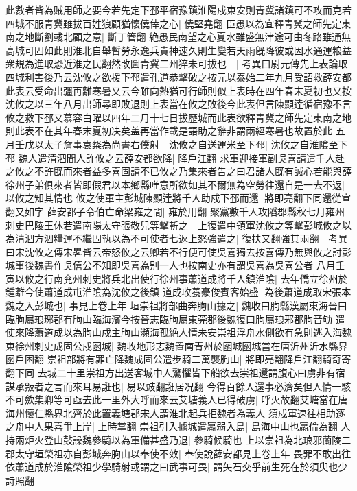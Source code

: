此數者皆為賊用師之要今若先定下邳平宿豫鎮淮陽戍東安則青冀諸鎮可不攻而克若四城不服青冀雖拔百姓狼顧猶懷僥倖之心|{
	僥堅堯翻}
臣愚以為宜釋青冀之師先定東南之地斷劉彧北顧之意|{
	斷丁管翻}
絶愚民南望之心夏水雖盛無津途可由冬路雖通無高城可固如此則淮北自舉暫勞永逸兵貴神速久則生變若天雨旣降彼或因水通運粮益衆規為進取恐近淮之民翻然改圖青冀二州猝未可拔也　|{
	考異曰尉元傳先上表論取四城利害後乃云沈攸之欲援下邳遣孔道恭擊破之按元以泰始二年九月受詔救薛安都此表云受命出疆再離寒暑又云今雖向熱猶可行師則似上表時在四年春末夏初也又按沈攸之以三年八月出師尋即敗退則上表當在攸之敗後今此表但言陳顯逹循宿豫不言攸之救下邳又慕容白曜以四年二月十七日拔歷城而此表欲釋青冀之師先定東南之地則此表不在其年春末夏初决矣盖再當作載是語助之辭非謂兩經寒暑也故置於此}
五月壬戌以太子詹事袁粲為尚書右僕射　沈攸之自送運米至下邳|{
	沈攸之自淮隂至下邳}
魏人遣清泗間人詐攸之云薛安都欲降|{
	降戶江翻}
求軍迎接軍副吳喜請遣千人赴之攸之不許旣而來者益多喜固請不已攸之乃集來者告之曰君諸人旣有誠心若能與薛徐州子弟俱來者皆即假君以本鄉縣唯意所欲如其不爾無為空勞往還自是一去不返|{
	以攸之知其情也}
攸之使軍主彭城陳顯逹將千人助戍下邳而還|{
	將即亮翻下同還從宣翻又如字}
薛安都子令伯亡命梁雍之間|{
	雍於用翻}
聚黨數千人攻䧟郡縣秋七月雍州刺史巴陵王休若遣南陽太守張敬兒等擊斬之　上復遣中領軍沈攸之等擊彭城攸之以為清泗方涸糧運不繼固執以為不可使者七返上怒強遣之|{
	復扶又翻強其兩翻　考異曰宋沈攸之傳宋畧皆云帝怒攸之云卿若不行便可使吳喜獨去按喜傳乃無與攸之討彭城事後魏書作吳僖公不知即吳喜為别一人也按南史亦有謂吳喜為吳喜公者}
八月壬寅以攸之行南兖州刺史將兵北出使行徐州事蕭道成將千人鎮淮隂|{
	去年僑立徐州於鍾離今使蕭道成屯淮隂為沈攸之後鎮}
道成收養豪俊賓客始盛|{
	為後蕭道成取宋張本}
魏之入彭城也|{
	事見上卷上年}
垣崇祖將部曲奔朐山據之|{
	魏收曰胊縣漢屬東海晉曰臨朐屬琅琊郡有朐山臨海濱今按晉志臨朐屬東莞郡後魏復曰朐屬琅邪郡朐音劬}
遣使來降蕭道成以為朐山戍主朐山瀕海孤絶人情未安崇祖浮舟水側欲有急則逃入海魏東徐州刺史成固公戍圂城|{
	魏收地形志魏置南青州於圂城圂城當在唐沂州沂水縣界圂戶困翻}
崇祖部將有罪亡降魏成固公遣步騎二萬襲朐山|{
	將即亮翻降戶江翻騎奇寄翻下同}
去城二十里崇祖方出送客城中人驚懼皆下船欲去崇祖還謂腹心曰虜非有宿謀承叛者之言而來耳易誑也|{
	易以豉翻誑居况翻}
今得百餘人還事必濟矣但人情一駭不可歛集卿等可亟去此一里外大呼而來云艾塘義人已得破虜|{
	呼火故翻艾塘當在唐海州懷仁縣界北齊於此置義塘郡宋人謂淮北起兵拒魏者為義人}
須戍軍速往相助逐之舟中人果喜爭上岸|{
	上時掌翻}
崇祖引入據城遣羸弱入島|{
	島海中山也羸倫為翻}
人持兩炬火登山鼔譟魏參騎以為軍備甚盛乃退|{
	參騎候騎也}
上以崇祖為北琅邪蘭陵二郡太守垣榮祖亦自彭城奔朐山以奉使不效|{
	奉使說薛安都見上卷上年}
畏罪不敢出往依蕭道成於淮隂榮祖少學騎射或謂之曰武事可畏|{
	謂矢石交乎前生死在於須臾也少詩照翻}
